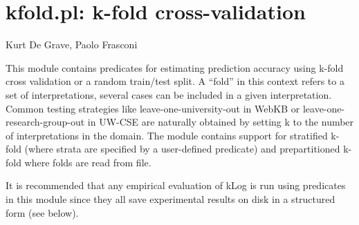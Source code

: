 


\section{kfold.pl: k-fold cross-validation}

\label{sec:kfold}

\begin{tags}
Kurt De Grave, Paolo Frasconi
\end{tags}

This module contains predicates for estimating prediction accuracy
using k-fold cross validation or a random train/test split. A
``fold'' in this context refers to a set of interpretations, several
cases can be included in a given interpretation. Common testing
strategies like leave-one-university-out in WebKB or
leave-one-research-group-out in UW-CSE are naturally obtained by
setting k to the number of interpretations in the domain. The module
contains support for stratified k-fold (where strata are specified
by a user-defined predicate) and prepartitioned k-fold where folds
are read from file.

It is recommended that any empirical evaluation of kLog is run using
predicates in this module since they all save experimental results
on disk in a structured form (see below).

